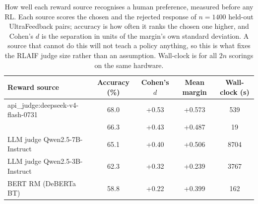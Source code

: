 \begin{table}[t]\centering\small
\caption{How well each reward source recognises a human preference, measured
before any RL. Each source scores the chosen and the rejected response of
$n=1400$ held-out UltraFeedback pairs; accuracy is how often it ranks the
chosen one higher, and Cohen's $d$ is the separation in units of the margin's
own standard deviation. A source that cannot do this will not teach a policy
anything, so this is what fixes the RLAIF judge size rather than an assumption.
Wall-clock is for all $2n$ scorings on the same hardware.}
\label{tab:judges}
\begin{tabular}{lcccc}
\toprule
Reward source & Accuracy (\%) & Cohen's $d$ & Mean margin & Wall-clock (s) \\
\midrule
api\_judge:deepseek-v4-flash-0731 & 68.0 & +0.53 & +0.573 & 539 \\
\jev{} & 66.3 & +0.43 & +0.487 & 19 \\
LLM judge Qwen2.5-7B-Instruct & 65.1 & +0.40 & +0.506 & 8704 \\
LLM judge Qwen2.5-3B-Instruct & 62.3 & +0.32 & +0.239 & 3767 \\
BERT RM (DeBERTa BT) & 58.8 & +0.22 & +0.399 & 162 \\
\bottomrule
\end{tabular}
\end{table}
